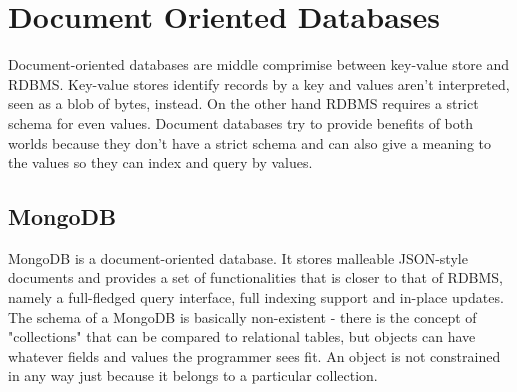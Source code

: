 \section{Document Oriented Databases}

Document-oriented databases are middle comprimise between key-value store and RDBMS. Key-value stores identify records by a key and values aren't interpreted, seen as a blob of bytes, instead. On the other hand RDBMS requires a strict schema for even values. Document databases try to provide benefits of both worlds because they don't have a strict schema and can also give a meaning to the values so they can index and query by values.

\subsection{MongoDB}

MongoDB is a document-oriented database. It stores malleable JSON-style documents and provides a set of functionalities that is closer to that of RDBMS, namely a full-fledged query interface, full indexing support and in-place updates. The schema of a MongoDB is basically non-existent - there is the concept of "collections" that can be compared to relational tables, but objects can have whatever fields and values the programmer sees fit. An object is not constrained in any way just because it belongs to a particular collection.

